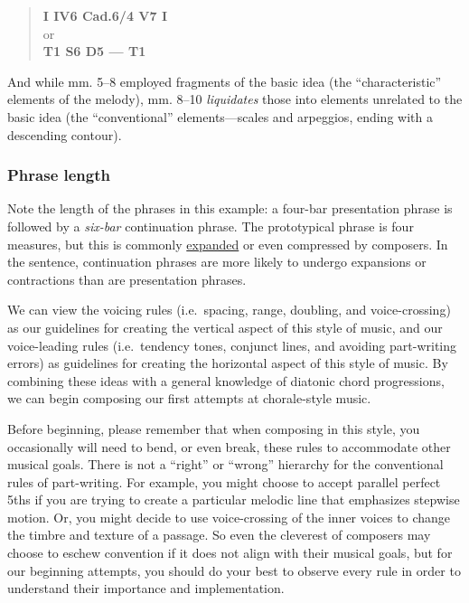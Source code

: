 \documentclass{book}
\begin{document}
\begin{quote}
\textbf{I IV6 Cad.6/4 V7 I}\\
or\\
\textbf{T1 S6 D5 --- T1}
\end{quote}

And while mm. 5--8 employed fragments of the basic idea (the
``characteristic'' elements of the melody), mm. 8--10 \emph{liquidates} those
into elements unrelated to the basic idea (the ``conventional''
elements---scales and arpeggios, ending with a descending contour).

\hypertarget{phrase-length}{%
\subsubsection{Phrase length}\label{phrase-length}}

Note the length of the phrases in this example: a four-bar presentation phrase
is followed by a \emph{six-bar} continuation phrase. The prototypical phrase
is four measures, but this is commonly
\href{internalExpansions.html}{expanded} or even compressed by composers. In
the sentence, continuation phrases are more likely to undergo expansions or
contractions than are presentation phrases.

We can view the voicing rules (i.e.~spacing, range, doubling, and
voice-crossing) as our guidelines for creating the vertical aspect of this
style of music, and our voice-leading rules (i.e.~tendency tones, conjunct
lines, and avoiding part-writing errors) as guidelines for creating the
horizontal aspect of this style of music. By combining these ideas with a
general knowledge of diatonic chord progressions, we can begin composing our
first attempts at chorale-style music.

Before beginning, please remember that when composing in this style, you
occasionally will need to bend, or even break, these rules to accommodate
other musical goals. There is not a ``right'' or ``wrong'' hierarchy for the
conventional rules of part-writing. For example, you might choose to accept
parallel perfect 5ths if you are trying to create a particular melodic line
that emphasizes stepwise motion. Or, you might decide to use voice-crossing of
the inner voices to change the timbre and texture of a passage. So even the
cleverest of composers may choose to eschew convention if it does not align
with their musical goals, but for our beginning attempts, you should do your
best to observe every rule in order to understand their importance and
implementation.
\end{document}
